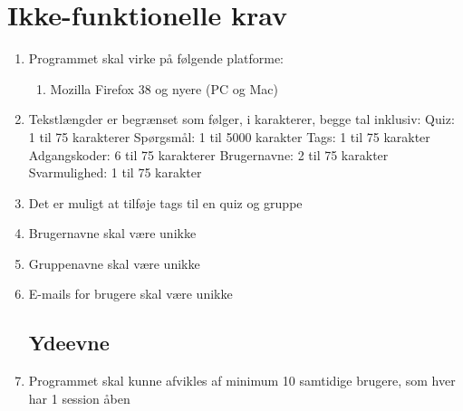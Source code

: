 \section{Ikke-funktionelle krav}
\label{sec:nonFunctional}

\begin{enumerate}
	\subsection*{Brugbarhed}
	\item Programmet skal virke på følgende platforme:
	\begin{enumerate}
		\item Mozilla Firefox 38 og nyere (PC og Mac)
	\end{enumerate}

	\item Tekstlængder er begrænset som følger, i karakterer, begge tal inklusiv:
	\subitem Quiz: 1 til 75 karakterer
	\subitem Spørgsmål: 1 til 5000 karakter
	\subitem Tags: 1 til 75 karakter
	\subitem Adgangskoder: 6 til 75 karakterer
	\subitem Brugernavne: 2 til 75 karakter
	\subitem Svarmulighed: 1 til 75 karakter
	\item Det er muligt at tilføje tags til en quiz og gruppe
	\item Brugernavne skal være unikke
	\item Gruppenavne skal være unikke
	\item E-mails for brugere skal være unikke
	
	\subsection*{Ydeevne}
	\item Programmet skal kunne afvikles af minimum 10 samtidige brugere, som hver har 1 session åben
\end{enumerate}